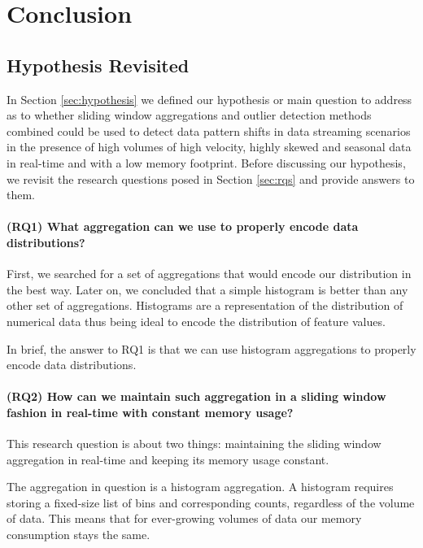 \chapter{Conclusion} \label{chap:conclusion} \minitoc

\section{Hypothesis Revisited}

In Section \ref{sec:hypothesis} we defined our hypothesis or main question to address as to whether sliding window aggregations and outlier detection methods combined could be used to detect data pattern shifts in data streaming scenarios in the presence of high volumes of high velocity, highly skewed and seasonal data in real-time and with a low memory footprint. Before discussing our hypothesis, we revisit the research questions posed in Section \ref{sec:rqs} and provide answers to them. 

\subsubsection*{(RQ1) What aggregation can we use to properly encode data distributions?}
First, we searched for a set of aggregations that would encode our distribution in the best way. Later on, we concluded that a simple histogram is better than any other set of aggregations. Histograms are a representation of the distribution of numerical data thus being ideal to encode the distribution of feature values. 

In brief, the answer to RQ1 is that we can use histogram aggregations to properly encode data distributions.

\subsubsection*{(RQ2) How can we maintain such aggregation in a sliding window fashion in real-time with constant memory usage?}

This research question is about two things: maintaining the sliding window aggregation in real-time and keeping its memory usage constant.

The aggregation in question is a histogram aggregation.
A histogram requires storing a fixed-size list of bins and corresponding counts, regardless of the volume of data. This means that for ever-growing volumes of data our memory consumption stays the same.

